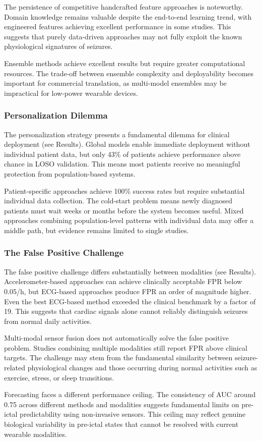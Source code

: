 The persistence of competitive handcrafted feature approaches is noteworthy. Domain knowledge remains valuable despite the end-to-end learning trend, with engineered features achieving excellent performance in some studies. This suggests that purely data-driven approaches may not fully exploit the known physiological signatures of seizures.

Ensemble methods achieve excellent results but require greater computational resources. The trade-off between ensemble complexity and deployability becomes important for commercial translation, as multi-model ensembles may be impractical for low-power wearable devices.

\subsubsection{Personalization Dilemma}

The personalization strategy presents a fundamental dilemma for clinical deployment (see Results). Global models enable immediate deployment without individual patient data, but only 43\% of patients achieve performance above chance in LOSO validation. This means most patients receive no meaningful protection from population-based systems.

Patient-specific approaches achieve 100\% success rates but require substantial individual data collection. The cold-start problem means newly diagnosed patients must wait weeks or months before the system becomes useful. Mixed approaches combining population-level patterns with individual data may offer a middle path, but evidence remains limited to single studies.

\subsubsection{The False Positive Challenge}

The false positive challenge differs substantially between modalities (see Results). Accelerometer-based approaches can achieve clinically acceptable FPR below 0.05/h, but ECG-based approaches produce FPR an order of magnitude higher. Even the best ECG-based method exceeded the clinical benchmark by a factor of 19. This suggests that cardiac signals alone cannot reliably distinguish seizures from normal daily activities.

Multi-modal sensor fusion does not automatically solve the false positive problem. Studies combining multiple modalities still report FPR above clinical targets. The challenge may stem from the fundamental similarity between seizure-related physiological changes and those occurring during normal activities such as exercise, stress, or sleep transitions.

Forecasting faces a different performance ceiling. The consistency of AUC around 0.75 across different methods and modalities suggests fundamental limits on pre-ictal predictability using non-invasive sensors. This ceiling may reflect genuine biological variability in pre-ictal states that cannot be resolved with current wearable modalities.
